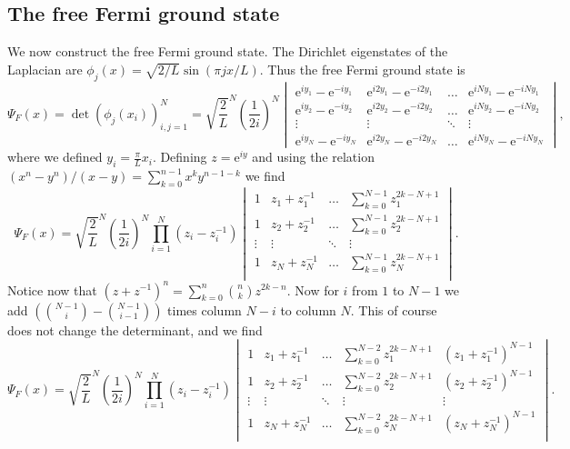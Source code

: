 \documentclass[a4paper,11pt]{article}
\newcommand{\euler}[1]{\text{e}^{#1}}
\numberwithin{equation}{section}
\begin{document}
	\subsection{The free Fermi ground state}
	We now construct the free Fermi ground state. The Dirichlet eigenstates of the Laplacian are $ \phi_j(x)=\sqrt{2/L}\sin(\pi j x/L) $. Thus the free Fermi ground state is \begin{equation}
	\Psi_F(x)=\det\left(\phi_j(x_i)\right)_{i,j=1}^{N}=\sqrt{\frac{2}{L}}^N\left(\frac{1}{2i}\right)^N\begin{vmatrix}
	\euler{iy_1}-\euler{-iy_1}&\euler{i2y_1}-\euler{-i2y_1}&\ldots&\euler{iNy_1}-\euler{-iNy_1}\\
	\euler{iy_2}-\euler{-iy_2}&\euler{i2y_2}-\euler{-i2y_2}&\ldots&\euler{iNy_2}-\euler{-iNy_2}\\
	\vdots&\vdots&\ddots&\vdots\\
	\euler{iy_N}-\euler{-iy_N}&\euler{i2y_N}-\euler{-i2y_N}&\ldots&\euler{iNy_N}-\euler{-iNy_N}
	\end{vmatrix},
	\end{equation}
	where we defined $ y_i=\frac{\pi}{L}x_i $. Defining $ z=\euler{iy} $ and using the relation $ (x^n-y^n)/(x-y)=\sum_{k=0}^{n-1}x^ky^{n-1-k} $ we find\begin{equation}
	\Psi_F(x)=\sqrt{\frac{2}{L}}^N\left(\frac{1}{2i}\right)^N\prod_{i=1}^{N}(z_i-z_i^{-1})\begin{vmatrix}
	1&z_1+z_1^{-1}&\ldots&\sum_{k=0}^{N-1}z_1^{2k-N+1}\\
	1&z_2+z_2^{-1}&\ldots&\sum_{k=0}^{N-1}z_2^{2k-N+1}\\
	\vdots&\vdots&\ddots&\vdots\\
	1&z_N+z_N^{-1}&\ldots&\sum_{k=0}^{N-1}z_N^{2k-N+1}\\
	\end{vmatrix}.
	\end{equation}
	Notice now that $ (z+z^{-1})^n=\sum_{k=0}^{n}\binom{n}{k}z^{2k-n} $.
	Now for $ i $ from $ 1 $ to $ N-1 $ we add $ \left(\binom{N-1}{i}-\binom{N-1}{i-1}\right) $ times column $ N-i $ to column $ N $. This of course does not change the determinant, and we find \begin{equation}
	\Psi_F(x)=\sqrt{\frac{2}{L}}^N\left(\frac{1}{2i}\right)^N\prod_{i=1}^{N}(z_i-z_i^{-1})\begin{vmatrix}
	1&z_1+z_1^{-1}&\ldots&\sum_{k=0}^{N-2}z_1^{2k-N+1}&(z_1+z_1^{-1})^{N-1}\\
	1&z_2+z_2^{-1}&\ldots&\sum_{k=0}^{N-2}z_2^{2k-N+1}&(z_2+z_2^{-1})^{N-1}\\
	\vdots&\vdots&\ddots&\vdots&\vdots\\
	1&z_N+z_N^{-1}&\ldots&\sum_{k=0}^{N-2}z_N^{2k-N+1}&(z_N+z_N^{-1})^{N-1}\\
	\end{vmatrix}.
	\end{equation}
\end{document}
